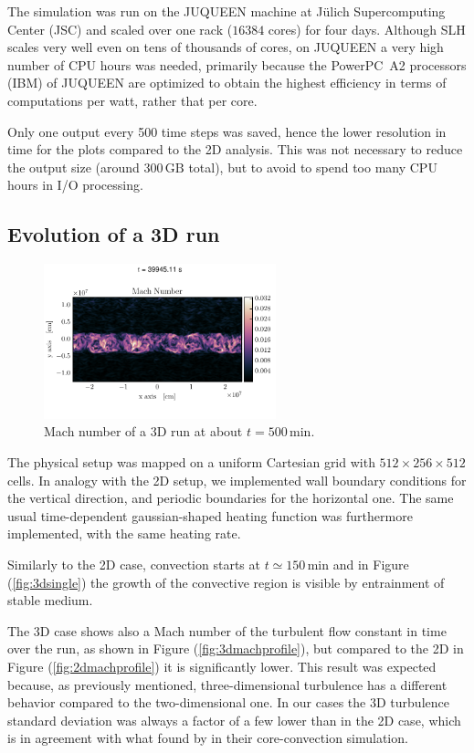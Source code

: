 The simulation was run on the JUQUEEN machine at Jülich Supercomputing Center (JSC) and scaled over one rack ($16384$ cores) for four days. Although SLH scales very well even on tens of thousands of cores, on JUQUEEN a very high number of CPU hours was needed, primarily because the PowerPC\textregistered \ A2 processors (IBM) of JUQUEEN are optimized to obtain the highest efficiency in terms of computations per watt, rather that per core. 
 
 Only one output every 500 time steps was saved, hence the lower resolution in time for the plots compared to the 2D analysis. This was not necessary to reduce the output size (around $300 \, \mathrm{GB}$ total), but to avoid to spend too many CPU hours in I/O processing.
\subsection{Evolution of a 3D run}

\begin{figure}[t!]
\centering
\includegraphics[width=0.6\textwidth]{./img/3dmach.pdf}
\caption{Mach number of a 3D run at about $t=500 \, \mathrm{min}$.}
\label{fig:3dmach}
\end{figure}

The physical setup was mapped on a uniform Cartesian grid with $512 \times 256 \times 512$ cells. In analogy with the 2D setup, we implemented wall boundary conditions for the vertical direction, and periodic boundaries for the horizontal one. The same usual time-dependent gaussian-shaped heating function was furthermore implemented, with the same heating rate.

Similarly to the 2D case, convection starts at $t \simeq 150 \, \mathrm{min}$ and in Figure (\ref{fig:3dsingle}) the growth of the convective region is visible by entrainment of stable medium.

The 3D case shows also a Mach number of the turbulent flow constant in time over the run, as shown in Figure (\ref{fig:3dmachprofile}), but compared to the 2D in Figure (\ref{fig:2dmachprofile}) it is significantly lower. This result was expected because, as previously mentioned, three-dimensional turbulence has a different behavior compared to the two-dimensional one. In our cases the 3D turbulence standard deviation was always a factor of a few lower than in the 2D case, which is in agreement with what found by \citet{meakin} in their core-convection simulation. 

